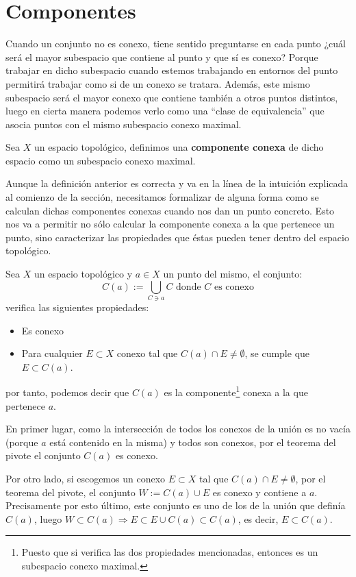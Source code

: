 \section{Componentes}%
\label{sec:componentes}
Cuando un conjunto no es conexo, tiene sentido preguntarse en cada punto ¿cuál será el mayor subespacio que contiene al punto y que sí es conexo? Porque trabajar en dicho subespacio cuando estemos trabajando en entornos del punto permitirá trabajar como si de un conexo se tratara. Además, este mismo subespacio será el mayor conexo que contiene también a otros puntos distintos, luego en cierta manera podemos verlo como una ``clase de equivalencia'' que asocia puntos con el mismo subespacio conexo maximal.

\begin{defi}
Sea $X$ un espacio topológico, definimos una \textbf{componente conexa} de dicho espacio como un subespacio conexo maximal.
\end{defi}

Aunque la definición anterior es correcta y va en la línea de la intuición explicada al comienzo de la sección, necesitamos formalizar de alguna forma como se calculan dichas componentes conexas cuando nos dan un punto concreto. Esto nos va a permitir no sólo calcular la componente conexa a la que pertenece un punto, sino caracterizar las propiedades que éstas pueden tener dentro del espacio topológico.

\begin{prop}
Sea $X$ un espacio topológico y $a\in X$ un punto del mismo, el conjunto:
\[
C(a) := \bigcup_{C \ni a} C \mbox{ donde }C \mbox{ es conexo}
\]
verifica las siguientes propiedades:
\begin{itemize}
\item Es conexo
\item Para cualquier $E\subset X$ conexo tal que $C(a) \cap E \neq \emptyset$, se cumple que $E \subset C(a)$.
\end{itemize}
por tanto, podemos decir que $C(a)$ es la componente\footnote{Puesto que si verifica las dos propiedades mencionadas, entonces es un subespacio conexo maximal.} conexa a la que pertenece $a$.
\end{prop}
\begin{demo}
En primer lugar, como la intersección de todos los conexos de la unión es no vacía (porque $a$ está contenido en la misma) y todos son conexos, por el teorema del pivote el conjunto $C(a)$ es conexo.

Por otro lado, si escogemos un conexo $E\subset X$ tal que $C(a) \cap E \neq \emptyset$, por el teorema del pivote, el conjunto $W := C(a)\cup E$ es conexo y contiene a $a$. Precisamente por esto último, este conjunto es uno de los de la unión que definía $C(a)$, luego $W \subset C(a) \Rightarrow E\subset E \cup C(a) \subset C(a)$, es decir, $E\subset C(a)$.
\end{demo}

